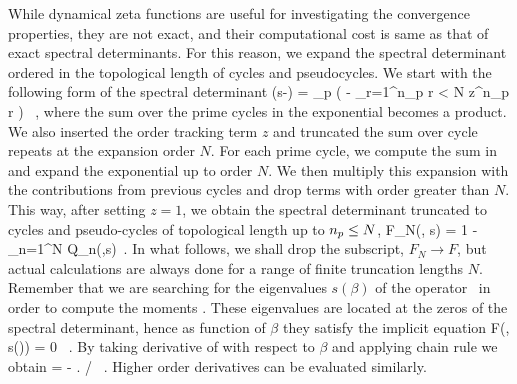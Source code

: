 While dynamical zeta functions are useful for investigating the convergence
properties, they are not exact, and their computational cost is same as that of
exact spectral determinants. For this reason, we expand the
spectral determinant  ordered in the topological
length of cycles and pseudocycles. We start with the following form of the
spectral determinant 
\beq
    \det (s-\Aop) =   \prod_p \exp \left( - \sum_{r=1}^{n_p r < N}
                               z^{n_p r} \right) \, ,
where the sum over the prime cycles in the exponential becomes a
product. We also inserted the order tracking term $z$ and truncated the sum over cycle
repeats at the expansion order $N$. For each prime cycle, we compute the sum in
 and expand the exponential up to order
$N$. We then multiply this expansion with the contributions from previous cycles
and drop terms with order greater than $N$. This way, after setting $z=1$,
we obtain the spectral determinant truncated to cycles and pseudo-cycles of
topological length up to $\cl{p} \leq N$,
\beq
    F_N(\beta , s) = 1 - \sum_{n=1}^{N} Q_n(\beta,s) \,. %
    \label{e-NthOrderSpectDet}
\eeq
In what follows, we shall drop the subscript, $F_N \to F$, but actual
calculations are always done for a range of finite truncation lengths
$N$. Remember that we are searching for the eigenvalues $s(\beta)$ of the
operator \Aop\ in order to compute the moments .
These eigenvalues are located at the zeros of the spectral
determinant, hence as  function of $\beta$ they satisfy the implicit
equation
\beq
    F(\beta, s(\beta )) = 0 \, .
    \label{e-FNimplicit}
\eeq
By taking derivative of  with respect to $\beta$ and
applying chain rule we obtain
\beq
     = - \left.  \right/
                                     \, .
\eeq
Higher order derivatives can be evaluated similarly.
